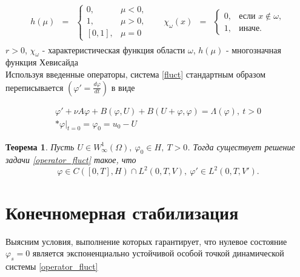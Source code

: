 \begin{gather*}
    \begin{matrix}
        h(\mu) & =
        & \left\{
        \begin{matrix}
            0, & \mu < 0, \\
            1, & \mu > 0, \\
            [0, 1], & \mu = 0
        \end{matrix} \right.
    \end{matrix} \quad
    \begin{matrix}
        \chi_{\omega}(x) & =
        & \left\{
        \begin{matrix}
            0, & \mbox{если } x \notin \omega, \\
            1, & \mbox{иначе. }
        \end{matrix} \right.
    \end{matrix}
\end{gather*}
$r > 0$, $\chi_{\omega}$ - характеристическая функция области $\omega$,
$h(\mu)$ - многозначная функция Хевисайда\\

Используя введенные операторы, система \eqref{fluct} стандартным образом
переписывается $(\varphi' = \frac{d\varphi}{dt})$ в виде

\begin{gather}\label{operator_fluct}
    \varphi' + \nu A\varphi + B(\varphi, U) + B(U + \varphi, \varphi) =
    \Lambda(\varphi), \ t > 0 \\*
    \varphi|_{t = 0} = \varphi_0 = u_0 - U
\end{gather}

\newtheorem{theorem}{Теорема}

\begin{theorem}
     Пусть $U \in W^1_{\infty}(\Omega), \ \varphi_0 \in H, \ T > 0$. 
    Тогда существует решение задачи \eqref{operator_fluct} такое, что
    $$\varphi \in C([0, T], H) \cap L^2(0, T, V), \ \varphi' \in L^2(0, T, V').$$
\end{theorem}

\section{Конечномерная стабилизация}
\vspace{1em}

Выясним условия, выполнение которых гарантирует, что нулевое состояние
$\varphi_s = 0$ является экспоненциально устойчивой особой точкой динамической
системы \eqref{operator_fluct}\\

